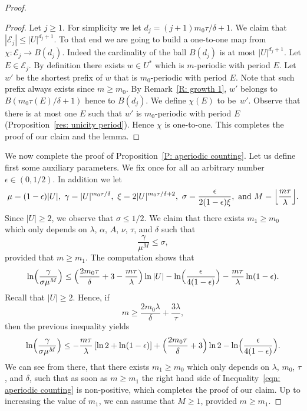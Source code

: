 \begin{proof}
\begin{proof}
Let $j \geq 1$.
For simplicity we let $d_j = (j+1)m_0\tau/\delta + 1$.
We claim that $| \mathcal E_j | \leq |U|^{d_j +1}$.
To that end we are going to build a one-to-one map from $\chi\colon\mathcal E_j \to B(d_j)$.
Indeed the cardinality of the ball $B(d_j)$ is at most $|U|^{d_j+1}$.
Let $E\in \mathcal{E}_j$.
By definition there exists $w \in U^*$ which is $m$-periodic with period $E$.
Let $w'$ be the shortest prefix of $w$ that is $m_0$-periodic with period $E$.
Note that such prefix always exists since $m\geq m_0$.
By Remark~\ref{R: growth 1}, $w'$ belongs to $B(m_0 \tau(E)/\delta+1)$ hence to $B(d_j)$.
We define $\chi(E)$ to be~$w'$.
Observe that there is at most one $E$ such that $w'$ is $m_0$-periodic with period $E$ (Proposition~\ref{res: unicity period}).
Hence $\chi$ is one-to-one.
This completes the proof of our claim and the lemma.
\end{proof}

We now complete the proof of Proposition~\ref{P: aperiodic counting}.
Let us define first some auxiliary parameters.
We fix once for all an arbitrary number $\epsilon \in (0,1/2)$.
In addition we let
\begin{equation*}
\mu = (1-\epsilon) |U|, \
\gamma = |U|^{m_0\tau/\delta}, \
\xi = 2 |U|^{m_0\tau/\delta + 2}, \
\sigma = \frac{ \epsilon}{2(1-\epsilon) \xi},
\ \text{and }
M = \Bigl\lfloor \frac{m\tau}\lambda \Bigr\rfloor.
\end{equation*}
Since $|U| \geq 2$, we observe that $\sigma \leq 1/2$.
We claim that there exists $m_1 \geq m_0$ which only depends on $\lambda$, $\alpha$, $A$, $\nu$, $\tau$, and $\delta$ such that
\begin{equation*}
\frac \gamma{\mu^M} \leq \sigma,
\end{equation*}
provided that $m \geq m_1$.
The computation shows that
\begin{equation*}
\ln \Bigl( \frac \gamma{\sigma \mu^M} \Bigr)
\leq \Bigl(\frac {2 m_0\tau}\delta + 3 - \frac {m\tau}\lambda\Bigr) \ln |U| - \ln\Bigl(\frac \epsilon {4(1-\epsilon)}\Bigr) - \frac {m\tau}\lambda \ln (1-\epsilon).
\end{equation*}
Recall that $|U| \geq 2$.
Hence, if
\begin{equation*}
m \geq \frac {2m_0\lambda}\delta + \frac{3\lambda}{\tau},
\end{equation*}
then the previous inequality yields
\begin{equation}
\label{eqn: aperiodic counting}
\ln \Bigl( \frac \gamma{\sigma \mu^M} \Bigr)
\leq - \frac{m\tau}\lambda \left[ \ln 2 + \ln (1 - \epsilon)\right] +
\Bigl(\frac {2 m_0\tau}\delta + 3 \Bigr) \ln 2 - \ln\Bigl(\frac \epsilon {4(1-\epsilon)}\Bigr).
\end{equation}
We can see from there, that there exists $m_1 \geq m_0$ which only depends on $\lambda$, $m_0$, $\tau$, and $\delta$, such that as soon as $m \geq m_1$ the right hand side of Inequality~\eqref{eqn: aperiodic counting} is non-positive, which completes the proof of our claim.
Up to increasing the value of $m_1$, we can assume that $M \geq 1$, provided $m \geq m_1$.


\end{proof}
